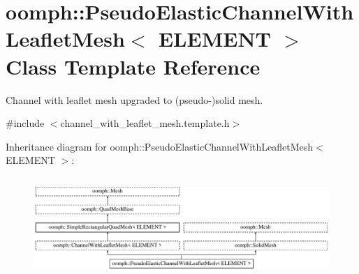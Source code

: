 \hypertarget{classoomph_1_1PseudoElasticChannelWithLeafletMesh}{}\section{oomph\+:\+:Pseudo\+Elastic\+Channel\+With\+Leaflet\+Mesh$<$ E\+L\+E\+M\+E\+NT $>$ Class Template Reference}
\label{classoomph_1_1PseudoElasticChannelWithLeafletMesh}


Channel with leaflet mesh upgraded to (pseudo-\/)solid mesh.  




{\ttfamily \#include $<$channel\+\_\+with\+\_\+leaflet\+\_\+mesh.\+template.\+h$>$}

Inheritance diagram for oomph\+:\+:Pseudo\+Elastic\+Channel\+With\+Leaflet\+Mesh$<$ E\+L\+E\+M\+E\+NT $>$\+:\begin{figure}[H]
\begin{center}
\leavevmode
\includegraphics[height=3.846154cm]{classoomph_1_1PseudoElasticChannelWithLeafletMesh}
\end{center}
\end{figure}
